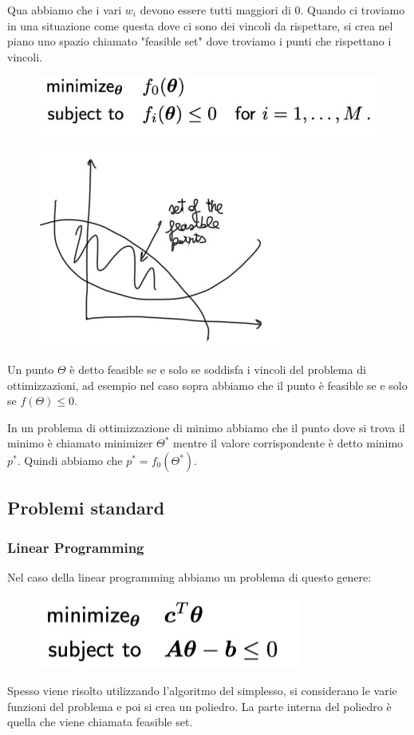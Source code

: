 \documentclass[14pt]{extreport}
\begin{document}
Qua abbiamo che i vari $w_i$ devono essere tutti maggiori di 0. Quando ci troviamo in una situazione come questa dove ci sono dei vincoli da
rispettare, si crea nel piano uno spazio chiamato "feasible set" dove troviamo i punti che rispettano i vincoli.
\begin{figure}[H]
	\centering
	\includegraphics[width=0.5\linewidth]{277.jpeg}
\end{figure}
\begin{figure}[H]
	\centering
	\includegraphics[width=0.4\linewidth]{276.jpeg}
\end{figure}

Un punto $\Theta$ è detto feasible se e solo se soddisfa i vincoli del problema di ottimizzazioni, ad esempio nel caso sopra abbiamo che il punto è
feasible se e solo se $f(\Theta) \leq 0$.

In un problema di ottimizzazione di minimo abbiamo che il punto dove si trova il minimo è chiamato minimizer $\Theta^*$ mentre il valore
corrispondente è detto minimo $p^*$. Quindi abbiamo che $p^* = f_0(\Theta^*)$.

\subsection{Problemi standard}

\subsubsection{Linear Programming}

Nel caso della linear programming abbiamo un problema di questo genere:
\begin{figure}[H]
	\centering
	\includegraphics[width=0.4\linewidth]{278.jpeg}
\end{figure}
Spesso viene risolto utilizzando l'algoritmo del simplesso, si considerano le varie funzioni del problema e poi si crea un poliedro. La parte interna
del poliedro è quella che viene chiamata feasible set.
\end{document}
